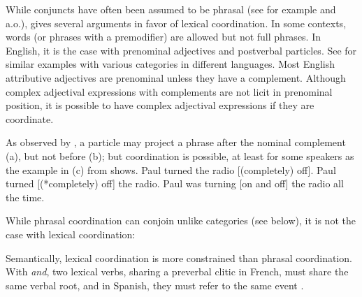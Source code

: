\documentclass[output=paper
                ,modfonts
                ,nonflat
	        ,collection
	        ,collectionchapter
	        ,collectiontoclongg
 	        ,biblatex
                ,babelshorthands
                ,newtxmath
                ,draftmode
                ,colorlinks, citecolor=brown
]{./langsci/langscibook}
\begin{document}
{%

While conjuncts have often been assumed to be phrasal (see for example \citet[Section~6.2]{Kayne:94} and \citet[Section~5.2]{bruening} a.o.), \citet{Abeille:06} gives several arguments in favor of lexical coordination.
In some contexts, words (or phrases with a premodifier) are allowed but not full phrases. In English, it is the case with prenominal adjectives and postverbal particles. See \citet[Section~4]{Abeille:06} for similar examples with various categories in different languages. Most English attributive adjectives are prenominal unless they have a complement. Although complex adjectival expressions with complements are not licit in prenominal position,  it is possible to have complex adjectival expressions if they are coordinate.

\begin{exe}
 \ex
\begin{xlista}
\end{xlista}
\end{exe}

As observed by \citet[--177]{hpsg1}, a particle may project a phrase after the nominal
complement (a), but not before (b); but coordination is possible, at least for some
speakers as the example in (c) from  shows.
\eal
\ex Paul turned the radio [(completely) off].
\ex Paul turned [(*completely) off] the radio.
\ex Paul was turning [on and off] the radio all the time.
\zl

While phrasal coordination can conjoin unlike categories (see below), it is not the case with lexical coordination:

\begin{exe}
 \ex
\begin{xlista}
\end{xlista}
\end{exe}

Semantically, lexical coordination is more constrained than phrasal coordination. With \textit{and}, two lexical verbs, sharing a preverbal clitic in French, must share the same verbal root, and in Spanish, they must refer to the same event \citep{Bosque:86}.

}
\end{document}

